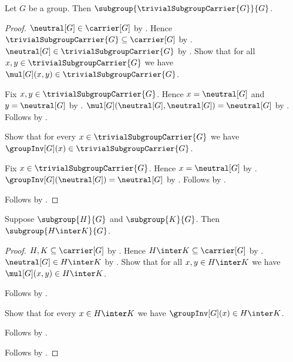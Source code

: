 \begin{proposition}\label{trivial_carrier_subgroup}
    Let $G$ be a group.
    Then $\subgroup{\trivialSubgroupCarrier{G}}{G}$.
\end{proposition}
\begin{proof}
    $\neutral[G]\in\carrier[G]$ by .
    Hence $\trivialSubgroupCarrier{G}\subseteq\carrier[G]$ by
        .
    $\neutral[G]\in\trivialSubgroupCarrier{G}$ by
        .
    Show that for all $x,y\in\trivialSubgroupCarrier{G}$ we have
        $\mul[G](x,y)\in\trivialSubgroupCarrier{G}$.
    \begin{subproof}
        Fix $x,y\in\trivialSubgroupCarrier{G}$.
        Hence $x=\neutral[G]$ and $y=\neutral[G]$ by
            .
        $\mul[G](\neutral[G],\neutral[G])=\neutral[G]$ by
            .
        Follows by .
    \end{subproof}
    Show that for every $x\in\trivialSubgroupCarrier{G}$ we have
        $\groupInv[G](x)\in\trivialSubgroupCarrier{G}$.
    \begin{subproof}
        Fix $x\in\trivialSubgroupCarrier{G}$.
        Hence $x=\neutral[G]$ by
            .
        $\groupInv[G](\neutral[G])=\neutral[G]$ by
            .
        Follows by .
    \end{subproof}
    Follows by .
\end{proof}

\begin{theorem}\label{subgroup_intersection}
    Suppose $\subgroup{H}{G}$ and $\subgroup{K}{G}$.
    Then $\subgroup{H\inter K}{G}$.
\end{theorem}
\begin{proof}
    $H,K\subseteq\carrier[G]$ by .
    Hence $H\inter K\subseteq\carrier[G]$ by
        .
    $\neutral[G]\in H\inter K$ by
        .
    Show that for all $x,y\in H\inter K$ we have
        $\mul[G](x,y)\in H\inter K$.
    \begin{subproof}
        Follows by
            .
    \end{subproof}
    Show that for every $x\in H\inter K$ we have
        $\groupInv[G](x)\in H\inter K$.
    \begin{subproof}
        Follows by
            .
    \end{subproof}
    Follows by .
\end{proof}

